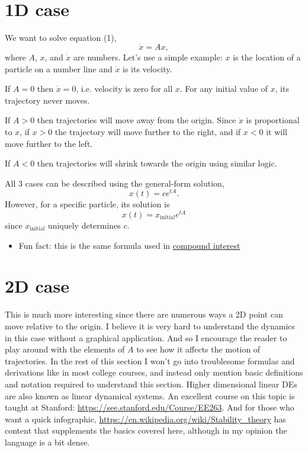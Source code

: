 \documentclass[11pt, oneside]{article}   	%
\begin{document}
\section{1D case}

We want to solve equation (1),
$$\dot{x} = Ax,$$
where $A$, $x$, and $\dot{x}$ are numbers.
Let's use a simple example: $x$ is the location of a particle on a number line and $\dot{x}$ is its velocity.

If $A = 0$ then $\dot{x} = 0$, i.e. velocity is zero for all $x$.
For any initial value of $x$, its trajectory never moves.

If $A > 0$ then trajectories will move away from the origin.
Since $\dot{x}$ is proportional to $x$,
if $x > 0$ the trajectory will move further to the right, and if $x < 0$ it will move further to the left.

If $A < 0$ then trajectories will shrink towards the origin using similar logic.

All 3 cases can be described using the general-form solution,
\begin{equation}
x(t) = ce^{tA} .
\end{equation}
However, for a specific particle, its solution is
\begin{equation}
x(t) = x_\mathrm{initial} e^{tA}
\end{equation}
since $x_\mathrm{initial}$ uniquely determines $c$.
\begin{itemize}
  \item Fun fact: this is the same formula used in \href{https://en.wikipedia.org/wiki/Compound_interest#Continuous_compounding}{compound interest}
\end{itemize}


\section{2D case}

This is much more interesting since there are numerous ways a 2D point can move relative to the origin.
I believe it is very hard to understand the dynamics in this case without a graphical application.
And so I encourage the reader to play around with the elements of $A$ to see how it affects the motion of trajectories.
In the rest of this section I won't go into troublesome formulas and derivations like in most college courses,
and instead only mention basic definitions and notation required to understand this section.
Higher dimensional linear DEs are also known as linear dynamical systems.
An excellent course on this topic is taught at Stanford: \url{https://see.stanford.edu/Course/EE263}.
And for those who want a quick infographic,
\url{https://en.wikipedia.org/wiki/Stability_theory} has content that supplements the basics covered here,
although in my opinion the language is a bit dense.
\end{document}
